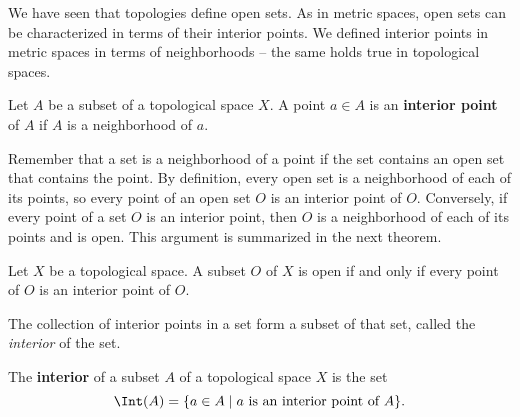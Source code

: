 \label{sec:Interiors_topology}


\vspace*{-17 pt}
\framebox{
\parbox{\dimexpr\linewidth-3\fboxsep-3\fboxrule}
{\begin{fqs}
\item 

\end{fqs}}}%

\vspace*{13 pt}

We have seen that topologies define open sets. As in metric spaces, open sets can be characterized in terms of their interior points. We defined interior points in metric spaces in terms of neighborhoods -- the same holds true in topological spaces. 

\begin{definition} Let $A$ be a subset of a topological space $X$. A point $a \in A$ is an \textbf{interior point} of $A$ if $A$ is a neighborhood of $a$.
\end{definition}

Remember that a set is a neighborhood of a point if the set contains an open set that contains the point. By definition, every open set is a neighborhood of each of its points, so every point of an open set $O$ is an interior point of $O$. Conversely, if every point of a set $O$ is an interior point, then $O$ is a neighborhood of each of its points and is open. This argument is summarized in the next theorem. 

\begin{theorem} Let $X$ be a topological space. A subset $O$ of $X$ is open if and only if every point of $O$ is an interior point of $O$. 
\end{theorem}

The collection of interior points in a set form a subset of that set, called the \emph{interior} of the set.

\begin{definition} The \textbf{interior} of a subset $A$ of a topological space $X$ is the set
\[\Int(A) = \{a \in A \mid a \text{ is an interior point of } A\}.\]
\end{definition}

